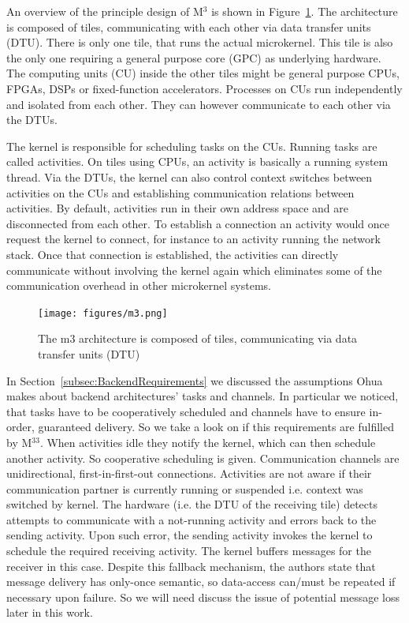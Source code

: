 An overview of the principle design of M$^3$ is shown in Figure~\ref{fig:m3}. The architecture is composed of tiles, communicating with each other via data transfer units (DTU). There is only one tile, that runs the actual microkernel. This tile is also the only one requiring a general purpose core (GPC) as underlying hardware. The computing units (CU) inside the other tiles might be general purpose CPUs, FPGAs, DSPs or fixed-function accelerators. Processes on CUs run independently and isolated from each other. They can however communicate to each other via the DTUs.

The kernel is responsible for scheduling tasks on the CUs. Running tasks are called activities. On tiles using CPUs, an activity is basically a running system thread. Via the DTUs, the kernel can also control context switches between activities on the CUs and establishing communication relations between activities. By default, activities run in their own address space and are disconnected from each other. To establish a connection an activity  would once request the kernel to connect, for instance to an activity  running the network stack. Once that connection is established, the activities can directly communicate without involving the kernel again which eliminates some of the communication overhead in other microkernel systems. 

\begin{figure}[H]
    \centering
    \texttt{[image: figures/m3.png]}
    \caption{The m3 architecture is composed of tiles, communicating via data transfer units (DTU)}
    \label{fig:m3}
\end{figure}

In Section~\ref{subsec:BackendRequirements} we discussed the assumptions Ohua makes about backend architectures' tasks and channels. In particular we noticed, that tasks have to be cooperatively scheduled and channels have to ensure in-order, guaranteed delivery. So we take a look on if this requirements are fulfilled by M$^33$.
When activities idle they notify the kernel, which can then schedule another activity. So cooperative scheduling is given. Communication channels are unidirectional, first-in-first-out connections. Activities are not aware if their communication partner is currently running or suspended i.e. context was switched by kernel. The hardware (i.e. the DTU of the receiving tile) detects attempts to communicate with a not-running activity and errors back to the sending activity. Upon such error, the sending activity invokes the kernel to schedule the required receiving activity. The kernel buffers messages for the receiver in this case. Despite this fallback mechanism, the authors state that message delivery has only-once semantic, so data-access can/must be repeated if necessary upon failure. So we will need discuss the issue of potential message loss later in this work. 

